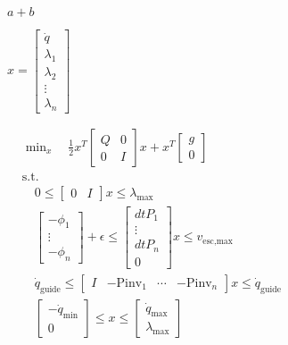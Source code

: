 \documentclass{article}
\begin{document}
$a+b$
\pagebreak

$ x = \begin{bmatrix} \dot{q} \\ \lambda_1 \\ \lambda_2 \\ \vdots \\ \lambda_n \end{bmatrix} $
\pagebreak

$ \begin{align*} &\min_{x} \quad \frac{1}{2} x^T \begin{bmatrix} Q & 0 \\ 0 & I \end{bmatrix} x + x^T \begin{bmatrix} g \\ 0 \end{bmatrix} \\ &\text{s.t.} \\ &\quad 0 \leq \begin{bmatrix} 0 & I \end{bmatrix} x \leq \lambda_{\max} \\ &\quad \begin{bmatrix} -\phi_1 \\ \vdots \\ -\phi_n \end{bmatrix} + \epsilon \leq \begin{bmatrix} dt P_1 \\ \vdots \\ dt P_n \\ 0 \end{bmatrix} x \leq v_{\text{esc,max}} \\ &\quad \dot{q}_{\text{guide}} \leq \begin{bmatrix} I & -\text{Pinv}_1 & \cdots & -\text{Pinv}_n \end{bmatrix} x \leq \dot{q}_{\text{guide}} \\ &\quad \begin{bmatrix} -\dot{q}_{\min} \\ 0 \end{bmatrix} \leq x \leq \begin{bmatrix} \dot{q}_{\max} \\ \lambda_{\max} \end{bmatrix} \end{align*} $
\pagebreak
\end{document}
